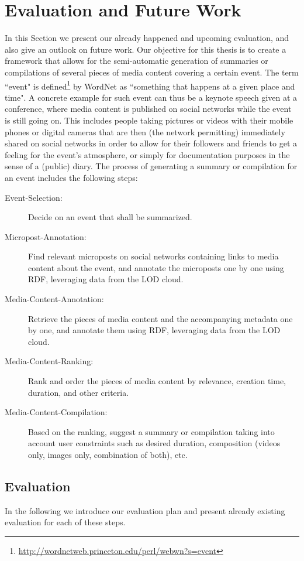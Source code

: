 \documentclass[12pt]{article}
\begin{document}
\section{Evaluation and Future Work}
In this Section we present our already happened and upcoming evaluation, and also give an outlook on future work. Our objective for this thesis is to create a framework that allows for the semi-automatic generation of summaries or compilations of several pieces of media content covering a certain event. The term ``event" is defined\footnote{\url{http://wordnetweb.princeton.edu/perl/webwn?s=event}} by WordNet as ``something that happens at a given place and time". A concrete example for such event can thus be a keynote speech given at a conference, where media content is published on social networks while the event is still going on. This includes people taking pictures or videos with their mobile phones or digital cameras that are then (the network permitting) immediately shared on social networks in order to allow for their followers and friends to get a feeling for the event's atmosphere, or simply for documentation purposes in the sense of a (public) diary. The process of generating a summary or compilation for an event includes the following steps:

\begin{description}
\item [Event-Selection:] Decide on an event that shall be summarized.
\item [Micropost-Annotation:] Find relevant microposts on social networks containing links to media content about the event, and annotate the microposts one by one using RDF, leveraging data from the LOD cloud.
\item [Media-Content-Annotation:] Retrieve the pieces of media content and the accompanying metadata one by one, and annotate them using RDF, leveraging data from the LOD cloud.
\item [Media-Content-Ranking:] Rank and order the pieces of media content by relevance, creation time, duration, and other criteria.
\item [Media-Content-Compilation:] Based on the ranking, suggest a summary or compilation taking into account user constraints such as desired duration, composition (videos only, images only, combination of both), etc.
\end{description}

\subsection{Evaluation}
In the following we introduce our evaluation plan and present already existing evaluation for each of these steps.
\end{document}
